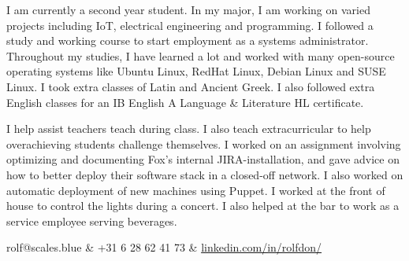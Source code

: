 





\secfont


{
    {
    I am currently a second year student. In my major, I am working on varied projects including IoT, electrical engineering and programming.
    }
    {
    I followed a study and working course to start employment as a systems administrator. Throughout my studies, I have learned a lot and worked with many open-source operating systems like Ubuntu Linux, RedHat Linux, Debian Linux and SUSE Linux.
    }
    {
    I took extra classes of Latin and Ancient Greek. I also followed extra English classes for an IB English A Language \& Literature HL certificate.
    }
}

{
    {
    I help assist teachers teach during class. I also teach extracurricular to help overachieving students challenge themselves.
    }
    {
    I worked on an assignment involving optimizing and documenting Fox's internal JIRA-installation, and gave advice on how to better deploy their software stack in a closed-off network. I also worked on automatic deployment of new machines using Puppet.
    }
    {
    I worked at the front of house to control the lights during a concert. I also helped at the bar to work as a service employee serving beverages.
    }
}

{
}

\vspace{1cm}

{
    rolf@scales.blue & +31 6 28 62 41 73 & \href{https://www.linkedin.com/in/rolfdon/}{linkedin.com/in/rolfdon/} 
}


